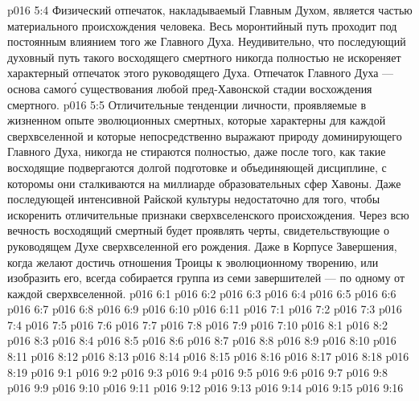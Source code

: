 \vs p016 5:4 Физический отпечаток, накладываемый Главным Духом, является частью материального происхождения человека. Весь моронтийный путь проходит под постоянным влиянием того же Главного Духа. Неудивительно, что последующий духовный путь такого восходящего смертного никогда полностью не искореняет характерный отпечаток этого руководящего Духа. Отпечаток Главного Духа --- основа самог\'о существования любой пред\hyp{}Хавонской стадии восхождения смертного.
\vs p016 5:5 Отличительные тенденции личности, проявляемые в жизненном опыте эволюционных смертных, которые характерны для каждой сверхвселенной и которые непосредственно выражают природу доминирующего Главного Духа, никогда не стираются полностью, даже после того, как такие восходящие подвергаются долгой подготовке и объединяющей дисциплине, с которомы они сталкиваются на миллиарде образовательных сфер Хавоны. Даже последующей интенсивной Райской культуры недостаточно для того, чтобы искоренить отличительные признаки сверхвселенского происхождения. Через всю вечность восходящий смертный будет проявлять черты, свидетельствующие о руководящем Духе сверхвселенной его рождения. Даже в Корпусе Завершения, когда желают достичь  отношения Троицы к эволюционному творению, или изобразить его, всегда собирается группа из семи завершителей --- по одному от каждой сверхвселенной.
\vs p016 6:1 
\vs p016 6:2 
\vs p016 6:3 
\vs p016 6:4 \pc 
\vs p016 6:5 
\vs p016 6:6 
\vs p016 6:7 
\vs p016 6:8 
\vs p016 6:9 \pc 
\vs p016 6:10 \pc 
\vs p016 6:11 
\vs p016 7:1 
\vs p016 7:2 
\vs p016 7:3 
\vs p016 7:4 
\vs p016 7:5 
\vs p016 7:6 \pc 
\vs p016 7:7 
\vs p016 7:8 \pc 
\vs p016 7:9 \pc 
\vs p016 7:10 
\vs p016 8:1 
\vs p016 8:2 
\vs p016 8:3 
\vs p016 8:4 
\vs p016 8:5 \pc 
\vs p016 8:6 
\vs p016 8:7 \pc 
\vs p016 8:8 
\vs p016 8:9 
\vs p016 8:10 
\vs p016 8:11 
\vs p016 8:12 
\vs p016 8:13 
\vs p016 8:14 
\vs p016 8:15 \pc 
\vs p016 8:16 
\vs p016 8:17 
\vs p016 8:18 
\vs p016 8:19 \pc 
{}
\vs p016 9:1 
\vs p016 9:2 
\vs p016 9:3 
\vs p016 9:4 \pc 
\vs p016 9:5 
\vs p016 9:6 
\vs p016 9:7 \pc 
\vs p016 9:8 
\vs p016 9:9 
\vs p016 9:10 
\vs p016 9:11 
\vs p016 9:12 
\vs p016 9:13 
\vs p016 9:14 \pc 
\vs p016 9:15 
\vsetoff
\vs p016 9:16 
\quizlink
